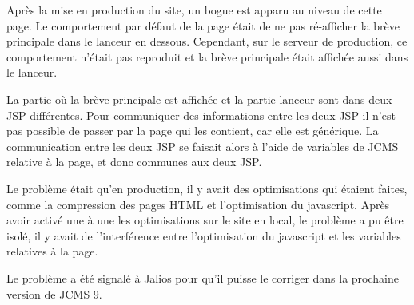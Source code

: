 \documentclass[12pt,a4paper]{article}
\begin{document}
\bigskip
Après la mise en production du site, un bogue est apparu au niveau de cette page. Le comportement par défaut de la page était de ne pas ré-afficher la brève principale dans le lanceur en dessous. Cependant, sur le serveur de production, ce comportement n'était pas reproduit et la brève principale était affichée aussi dans le lanceur.\par 
La partie où la brève principale est affichée et la partie lanceur sont dans deux JSP différentes. Pour communiquer des informations entre les deux JSP il n'est pas possible de passer par la page qui les contient, car elle est générique. La communication entre les deux JSP se faisait alors à l'aide de variables de \gls{JCMS} relative à la page, et donc communes aux deux JSP.\par 
Le problème était qu'en production, il y avait des optimisations qui étaient faites, comme la compression des pages HTML et l'optimisation du javascript. Après avoir activé une à une les optimisations sur le site en local, le problème a pu être isolé, il y avait de l'interférence entre l'optimisation du javascript et les variables relatives à la page.\par 
Le problème a été signalé à Jalios pour qu'il puisse le corriger dans la prochaine version de \gls{JCMS} 9.\par

\newpage
\end{document}
